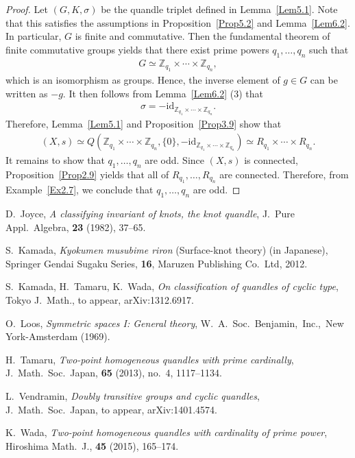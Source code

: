\documentclass[12pt]{amsart}
\theoremstyle{definition}
\begin{document}
\begin{proof}
Let $ (G,K,\sigma) $ be the quandle triplet defined in Lemma~\ref{Lem5.1}. Note that this satisfies the assumptions in Proposition~\ref{Prop5.2} and Lemma~\ref{Lem6.2}. In particular, $ G $ is finite and commutative. Then the fundamental theorem of finite commutative groups yields that there exist prime powers $ q_{1}, \ldots, q_{n} $ such that
\begin{align*}
G \simeq {{\mathbb Z}}_{q_{1}} \times \cdots \times {{\mathbb Z}}_{q_{n}},
\end{align*}
which is an isomorphism as groups. Hence, the inverse element of $ g \in G $ can be written as $ -g $. It then follows from Lemma~\ref{Lem6.2} (3) that
\begin{align*}
\sigma = -{\mathrm{id}}_{{{\mathbb Z}}_{q_{1}} \times \cdots \times {{\mathbb Z}}_{q_{n}}}.
\end{align*}
Therefore, Lemma~\ref{Lem5.1} and Proposition~\ref{Prop3.9} show that
\begin{align*}
(X,s) \simeq Q({{\mathbb Z}}_{q_{1}} \times \cdots \times {{\mathbb Z}}_{q_{n}}, \{ 0 \}, -{\mathrm{id}}_{{{\mathbb Z}}_{q_{1}} \times \cdots \times {{\mathbb Z}}_{q_{n}}}) \simeq R_{q_{1}} \times \cdots \times R_{q_{n}}.
\end{align*}
It remains to show that $ q_{1}, \ldots, q_{n} $ are odd. Since $ (X,s) $ is connected, Proposition~\ref{Prop2.9} yields that all of $ R_{q_{1}}, \ldots, R_{q_{n}} $ are connected. Therefore, from Example~\ref{Ex2.7}, we conclude that $ q_{1}, \ldots, q_{n} $ are odd.
\end{proof}

\begin{thebibliography}{9} 
 D.~Joyce, 
\textit{A classifying invariant of knots, the knot quandle}, 
J.\ Pure Appl.\ Algebra, \textbf{23} (1982), 37--65.

 S.~Kamada, 
\textit{Kyokumen musubime riron} 
(Surface-knot theory) (in Japanese), 
Springer Gendai Sugaku Series, \textbf{16}, 
Maruzen Publishing Co.\ Ltd, 2012. 

 S.~Kamada, H.~Tamaru, K.~Wada, 
\textit{On classification of quandles of cyclic type}, 
Tokyo J.\ Math., to appear, arXiv:1312.6917. 

 O.~Loos, 
\textit{Symmetric spaces I: General theory}, 
W.\ A.\ Soc.\ Benjamin,\ Inc.,\ New York-Amsterdam (1969).

 H.~Tamaru, 
\textit{Two-point homogeneous quandles with prime cardinally}, 
J.\ Math.\ Soc.\ Japan, \textbf{65} (2013), no.\ 4, 1117--1134.

 L.~Vendramin, 
\textit{Doubly transitive groups and cyclic quandles}, 
J.\ Math.\ Soc.\ Japan, to appear, arXiv:1401.4574. 

 K.~Wada, 
\textit{Two-point homogeneous quandles with cardinality of prime power}, 
Hiroshima Math.\ J., \textbf{45} (2015), 165--174. 

\end{thebibliography}
\end{document}
